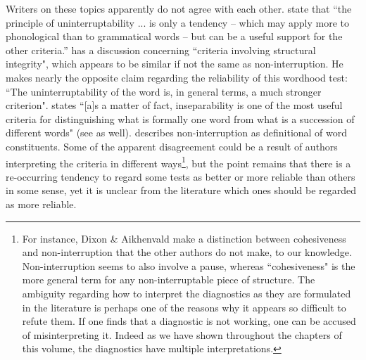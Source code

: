 \documentclass[output=paper,draftmode]{langscibook}
\begin{document}
Writers on these topics apparently do not agree with each other. \citet[25]{dixonaikhenvald02} state that ``the principle of uninterruptability ... is only a tendency -- which may apply more to phonological than to grammatical words -- but can be a useful support for the other criteria.'' \citet[17]{bauer2017compounds} has a discussion concerning ``criteria involving structural integrity", which appears to be similar if not the same as non-interruption. He makes nearly the opposite claim regarding the reliability of this wordhood test: ``The uninterruptability of the word is, in general terms, a much stronger criterion". 
\citet[92]{martinet1962functional} states ``[a]s a matter of fact, inseparability is one of the most useful criteria for distinguishing what is formally one word from what is a succession of different words" (see \citealt[164--165]{brown1980syntax} as well). \citet[185-187]{booij2005grammar} describes non-interruption as definitional of word constituents. Some of the apparent disagreement could be a result of authors interpreting the criteria in different ways\footnote{For instance, Dixon \& Aikhenvald make a distinction between cohesiveness and non-interruption that the other authors do not make, to our knowledge. Non-interruption seems to also involve a pause, whereas ``cohesiveness" is the more general term for any non-interruptable piece of structure. The ambiguity regarding how to interpret the diagnostics as they are formulated in the literature is perhaps one of the reasons why it appears so difficult to refute them. If one finds that a diagnostic is not working, one can be accused of misinterpreting it. Indeed as we have shown throughout the chapters of this volume, the diagnostics have multiple interpretations.}, but the point remains that there is a re-occurring tendency to regard some tests as better or more reliable than others in some sense, yet it is unclear from the literature which ones should be regarded as more reliable.
\end{document}
